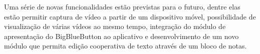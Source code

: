\documentclass{acm_proc_article-sp}
\begin{document}
Uma série de novas funcionalidades estão previstas para o futuro, dentre elas estão permitir captura de vídeo a partir de um dispositivo móvel, possibilidade de visualização de várias vídeos ao mesmo tempo, integração do módulo de apresentação do BigBlueButton ao aplicativo e desenvolvimento de um novo módulo que permita edição cooperativa de texto através de um bloco de notas.

%

%
%
\balancecolumns
\end{document}
